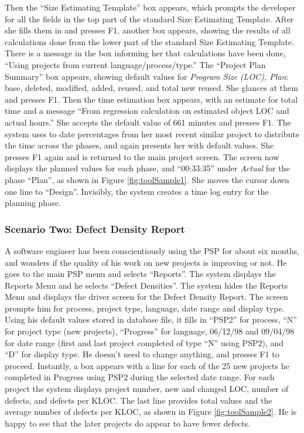 Then the ``Size Estimating Template'' box appears, which prompts the
developer for all the fields in the top part of the standard Size
Estimating Template.  After she fills them in and presses F1, another box
appears, showing the results of all calculations done from the lower part
of the standard Size Estimating Template.  There is a message in the box
informing her that calculations have been done, ``Using projects from
current language/process/type.''  The ``Project Plan Summary'' box appears,
showing default values for {\it Program Size (LOC), Plan}: base, deleted,
modified, added, reused, and total new reused.  She glances at them and
presses F1.  Then the time estimation box appears, with an estimate for
total time and a message ``From regression calculation on estimated object
LOC and actual hours.''  She accepts the default value of 661 minutes and
presses F1.  The system uses to date percentages from her most recent
similar project to distribute the time across the phases, and again
presents her with default values.  She presses F1 again and is returned to
the main project screen.  The screen now displays the planned values for
each phase, and ``00:33:35'' under {\it Actual} for the phase ``Plan'', as
shown in Figure \ref{fig:toolSample1}.  She moves the cursor down one line
to ``Design''.  Invisibly, the system creates a time log entry for the
planning phase.


\subsubsection{Scenario Two: Defect Density Report} 
A software engineer has been conscientiously using the PSP for about six
months, and wonders if the quality of his work on new projects is improving
or not.  He goes to the main PSP menu and selects ``Reports''.  The system
displays the Reports Menu and he selects ``Defect Densities''.  The system
hides the Reports Menu and displays the driver screen for the Defect
Density Report.  The screen prompts him for process, project type,
language, date range and display type. Using his default values stored in
database file, it fills in ``PSP2'' for process, ``N'' for project type
(new projects), ``Progress'' for language, 06/12/98 and 09/04/98 for date
range (first and last project completed of type ``N'' using PSP2), and
``D'' for display type.  He doesn't need to change anything, and presses F1
to proceed.  Instantly, a box appears with a line for each of the 25 new
projects he completed in Progress using PSP2 during the selected date
range.  For each project the system displays project number, new and
changed LOC, number of defects, and defects per KLOC.  The last line
provides total values and the average number of defects per KLOC, as shown
in Figure \ref{fig:toolSample2}.  He is happy to see that the later
projects do appear to have fewer defects.


